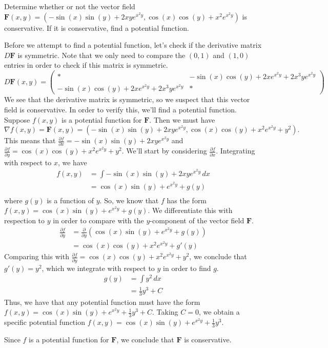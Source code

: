 \begin{example}
Determine whether or not the vector field $\mathbf{F}(x,y) = (-\sin(x)\sin(y)+2xye^{x^2y},\cos(x)\cos(y)+x^2e^{x^2y})$ is conservative. If it is conservative, find a potential function.
\begin{explanation}
Before we attempt to find a potential function, let's check if the derivative matrix $D\mathbf{F}$ is symmetric. Note that we only need to compare the $(0,1)$ and $(1,0)$ entries in order to check if this matrix is symmetric.
\[
D\mathbf{F}(x,y) = \left(\begin{array}{cc}
*&-\sin(x)\cos(y)+2xe^{x^2y}+2x^3ye^{x^2y}\\
-\sin(x)\cos(y)+2xe^{x^2y}+2x^3ye^{x^2y}&*\end{array}\right)
\]
We see that the derivative matrix is symmetric, so we suspect that this vector field is conservative. In order to verify this, we'll find a potential function.
Suppose $f(x,y)$ is a potential function for $\mathbf{F}$. Then we must have
\[
\nabla f(x,y)=\mathbf{F}(x,y)=(-\sin(x)\sin(y)+2xye^{x^2y},\cos(x)\cos(y)+x^2e^{x^2y}+y^2).
\]
This means that $\frac{\partial f}{\partial x} = -\sin(x)\sin(y)+2xye^{x^2y}$ and $\frac{\partial f}{\partial y} = \cos(x)\cos(y)+x^2e^{x^2y}+y^2$. We'll start by considering $\frac{\partial f}{\partial x}$. Integrating with respect to $x$, we have
\begin{align*}
f(x,y) &= \int -\sin(x)\sin(y)+2xye^{x^2y}\,dx\\
&= \cos(x)\sin(y)+e^{x^2y}+g(y)\\
\end{align*}
where $g(y)$ is a function of $y$. So, we know that $f$ has the form $f(x,y)=\cos(x)\sin(y)+e^{x^2y}+g(y)$. We differentiate this with respection to $y$ in order to compare with the $y$-component of the vector field $\mathbf{F}$.
\begin{align*}
\frac{\partial f}{\partial y} &= \frac{\partial}{\partial y}\left(\cos(x)\sin(y)+e^{x^2y}+g(y)\right)\\
&= \cos(x)\cos(y) + x^2e^{x^2y}+g'(y)
\end{align*}
Comparing this with $\frac{\partial f}{\partial y} = \cos(x)\cos(y)+x^2e^{x^2y}+y^2$, we conclude that $g'(y)=y^2$, which we integrate with respect to $y$ in order to find $g$.
\begin{align*}
g(y) &= \int y^2\,dx\\
&=\frac{1}{3}y^3+C
\end{align*}
Thus, we have that any potential function must have the form $f(x,y) = \cos(x)\sin(y)+e^{x^2y}+\frac{1}{3}y^3+C$. Taking $C=0$, we obtain a specific potential function $f(x,y) = \cos(x)\sin(y)+e^{x^2y}+\frac{1}{3}y^3$.

Since $f$ is a potential function for $\mathbf{F}$, we conclude that $\mathbf{F}$ is conservative.
\end{explanation}
\end{example}